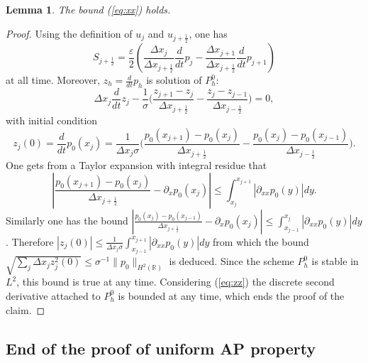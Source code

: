 \documentclass[a4paper,french,english,10pt]{article}
\newcommand\eps{\varepsilon}
\newtheorem{lemma}[theorem]{Lemma}
\begin{document}
\begin{lemma}\label{pro:H1}
The bound (\ref{eq:xx}) holds.
\end{lemma}

\begin{proof}

Using the definition of $u_j$
and $u_{j+\frac12 }$, one has 
$$
S_{j+\frac12 }=\frac{\eps}{2}\left( \frac{ \Delta x_j}{\Delta x_{j+\frac12}}
\frac{d}{dt} p_j - \frac{\Delta x_{j+1}}{\Delta x_{j+\frac12}} \frac{d}{dt} p_{j+1} \right)
$$
 at all time.
Moreover, $z_h=\frac{d}{dt} p_h$ is solution of
$P_h^0$:
$$
\Delta x_j\frac{d}{dt} z_j -\frac{1}{\sigma } \bigg(
\frac{z_{j+1}-z_j}{\Delta x_{j+\frac12 }}-\frac{z_j -z_{j-1}}{\Delta
x_{j-\frac12 }}\bigg)=0,
$$
with initial condition
\begin{equation}\label{eq:zz}
z_j(0)=\frac{d}{dt} p_0(x_j)=
\frac1 {\Delta x_j \sigma } \bigg(
\frac{p_0(x_{j+1})-p_0(x_j)}{\Delta x_{j+\frac12 }}-\frac{p_0(x_j)
 -p_0(x_{j-1}  )}{\Delta
x_{j-\frac12 }}\bigg).
\end{equation}
One gets from a Taylor expansion with integral residue
that
$$
\left|
\frac{p_0( x_{j+1}) -p_0(x_j)}{\Delta x_{j+\frac12 }}- 
\partial_x p _0(x_j)
\right|\leq 
 \int_{x_j}^{x_{j+1}  } \left|\partial_{xx}p_0(y)   \right| dy .$$ 
Similarly one has the bound
$
\left|
 \frac{p_0( x_{j}) -p_0(x_{j-1})}{\Delta x_{j+\frac12 }}-
\partial_x p _0(x_j)\right|
\leq
 \int_{x_{j-1}}^{x_{j}  } \left|\partial_{xx}p_0(y)   \right| dy $.
Therefore $|z_j(0)|\leq
\frac1 {\Delta x_j \sigma }  \int_{x_{j-1}}^{x_{j+1}  } \left|\partial_{xx}p_0(y)  
 \right| dy $ from which the bound
$
\sqrt{ \sum_j \Delta x_j z_j^2(0) }
\leq \sigma^{-1}\|p_0\|_{H^2(\mathbb{R})}$
is deduced.
Since the scheme $P_h^0$ is stable in $L^2$, this bound is true at any time.
Considering (\ref{eq:zz}) the discrete second derivative
attached to $P_h^0$ is bounded at any time, which ends the proof
of the claim.
\end{proof} 

\subsection{End of the proof of uniform AP property}
\end{document}
